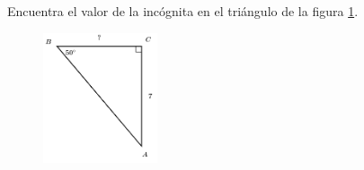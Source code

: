 Encuentra el valor de la incógnita en el triángulo de la figura \ref{fig:lados_functrig_28}.
\begin{figure}[H]
    \begin{center}
        \includegraphics[width=0.3\textwidth]{../images/lados_functrig_28.png}
    \end{center}
    \caption{}
    \label{fig:lados_functrig_28}
\end{figure}